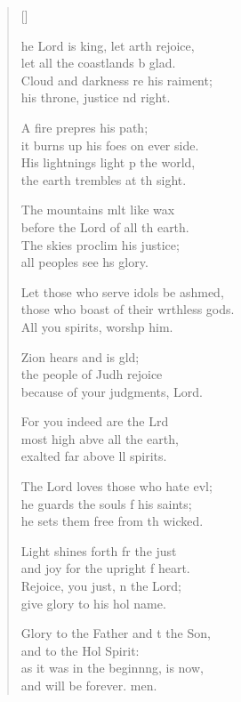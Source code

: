 \settowidth{\versewidth}{those who boast of their worthless gods. *}
\begin{verse}[\versewidth]
  \begin{patverse}
    he Lord is king, let arth rejoice,\Med\\
let all the coastlands b glad.\\
Cloud and darkness re his raiment;\Med\\
his throne, justice nd right.

A fire prepres his path;\Med\\
it burns up his foes on ever side.\\
His lightnings light p the world,\Med\\
the earth trembles at th sight.

The mountains mlt like wax\Med\\
before the Lord of all th earth.\\
The skies proclim his justice;\Med\\
all peoples see h\pointup{\i}s glory.

Let those who serve idols be ashmed,\Flex\\
those who boast of their wrthless gods.\Med\\
All you spirits, worsh\pointup{\i}p him.

Zion hears and is gld;\Flex\\
the people of Judh rejoice\Med\\
because of your judgments,  Lord.

For you indeed are the Lrd\Flex\\
most high abve all the earth,\Med\\
exalted far above ll spirits.

The Lord loves those who hate ev\pointup{\i}l;\Flex\\
he guards the souls f his saints;\Med\\
he sets them free from th wicked.

Light shines forth fr the just\Med\\
and joy for the upright f heart.\\
Rejoice, you just, \pointup{\i}n the Lord;\Med\\
give glory to his hol name.

Glory to the Father and t the Son,\Med\\
and to the Hol Spirit:\\
as it was in the beginn\pointup{\i}ng, is now,\Med\\
and will be forever. men.
  \end{patverse}
\end{verse}
